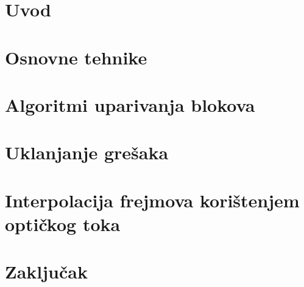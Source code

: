 \documentclass[12pt]{report}
\begin{document}
\tableofcontents

\chapter{Uvod}


\chapter{Osnovne tehnike}


\chapter{Algoritmi uparivanja blokova}

\chapter{Uklanjanje gre\v{s}aka}

\chapter{Interpolacija frejmova kori\v{s}tenjem opti\v{c}kog toka}

\chapter{Zaklju\v{c}ak}
\end{document}
